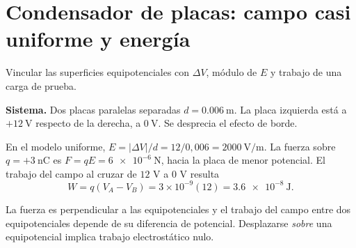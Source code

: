 \documentclass[11pt,a4paper]{article}
\newcommand{\ej}[2]{\clearpage\section{#2}}
\begin{document}
\ej{6}{Condensador de placas: campo casi uniforme y energía}
\begin{objetivo}Vincular las superficies equipotenciales con $\Delta V$, módulo de $E$ y trabajo de una carga de prueba.\end{objetivo}
\textbf{Sistema.} Dos placas paralelas separadas $d=\SI{0.006}{\metre}$. La placa izquierda está a $+\SI{12}{\volt}$ respecto de la derecha, a $\SI{0}{\volt}$. Se desprecia el efecto de borde.
\begin{center}\end{center}
\begin{metodo}
En el modelo uniforme, $E=|\Delta V|/d=12/0{,}006=\SI{2000}{\volt\per\metre}$. La fuerza sobre $q=+\SI{3}{\nano\coulomb}$ es $F=qE=\SI{6e-6}{\newton}$, hacia la placa de menor potencial. El trabajo del campo al cruzar de $12$ V a $0$ V resulta
\[W=q(V_A-V_B)=3\times10^{-9}(12)=\SI{3.6e-8}{\joule}.\]
\end{metodo}
\begin{resultado}La fuerza es perpendicular a las equipotenciales y el trabajo del campo entre dos equipotenciales depende de su diferencia de potencial. Desplazarse \emph{sobre} una equipotencial implica trabajo electrostático nulo.\end{resultado}
\end{document}
